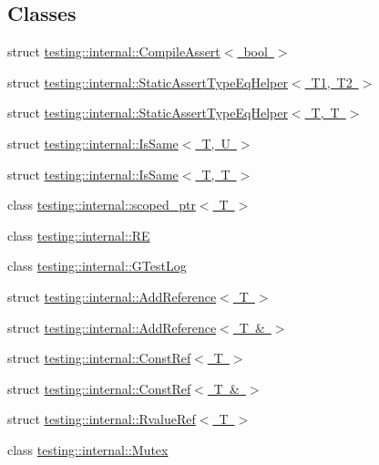 \subsection*{Classes}
\begin{DoxyCompactItemize}
\item 
struct \mbox{\hyperlink{structtesting_1_1internal_1_1_compile_assert}{testing\+::internal\+::\+Compile\+Assert$<$ bool $>$}}
\item 
struct \mbox{\hyperlink{structtesting_1_1internal_1_1_static_assert_type_eq_helper}{testing\+::internal\+::\+Static\+Assert\+Type\+Eq\+Helper$<$ T1, T2 $>$}}
\item 
struct \mbox{\hyperlink{structtesting_1_1internal_1_1_static_assert_type_eq_helper_3_01_t_00_01_t_01_4}{testing\+::internal\+::\+Static\+Assert\+Type\+Eq\+Helper$<$ T, T $>$}}
\item 
struct \mbox{\hyperlink{structtesting_1_1internal_1_1_is_same}{testing\+::internal\+::\+Is\+Same$<$ T, U $>$}}
\item 
struct \mbox{\hyperlink{structtesting_1_1internal_1_1_is_same_3_01_t_00_01_t_01_4}{testing\+::internal\+::\+Is\+Same$<$ T, T $>$}}
\item 
class \mbox{\hyperlink{classtesting_1_1internal_1_1scoped__ptr}{testing\+::internal\+::scoped\+\_\+ptr$<$ T $>$}}
\item 
class \mbox{\hyperlink{classtesting_1_1internal_1_1_r_e}{testing\+::internal\+::\+RE}}
\item 
class \mbox{\hyperlink{classtesting_1_1internal_1_1_g_test_log}{testing\+::internal\+::\+G\+Test\+Log}}
\item 
struct \mbox{\hyperlink{structtesting_1_1internal_1_1_add_reference}{testing\+::internal\+::\+Add\+Reference$<$ T $>$}}
\item 
struct \mbox{\hyperlink{structtesting_1_1internal_1_1_add_reference_3_01_t_01_6_01_4}{testing\+::internal\+::\+Add\+Reference$<$ T \& $>$}}
\item 
struct \mbox{\hyperlink{structtesting_1_1internal_1_1_const_ref}{testing\+::internal\+::\+Const\+Ref$<$ T $>$}}
\item 
struct \mbox{\hyperlink{structtesting_1_1internal_1_1_const_ref_3_01_t_01_6_01_4}{testing\+::internal\+::\+Const\+Ref$<$ T \& $>$}}
\item 
struct \mbox{\hyperlink{structtesting_1_1internal_1_1_rvalue_ref}{testing\+::internal\+::\+Rvalue\+Ref$<$ T $>$}}
\item 
class \mbox{\hyperlink{classtesting_1_1internal_1_1_mutex}{testing\+::internal\+::\+Mutex}}

\end{DoxyCompactItemize}
